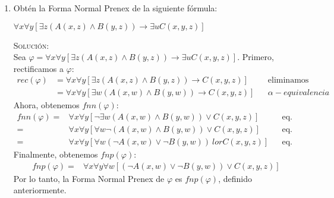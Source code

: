 \documentclass[letterpaper,11pt]{article}
\begin{document}
\begin{enumerate}
\begin{itemize}
        \end{itemize}
        \item Obtén la Forma Normal Prenex de la siguiente fórmula:
        \begin{center}
            $\forall x \forall y[\exists z (A(x,z) \land B(y,z)) 
            \rightarrow \exists u C(x,y,z)]$
        \end{center}
        \textsc{Solución:}\\
        Sea $\varphi = \forall x \forall y[\exists z (A(x,z) \land B(y,z)) 
        \rightarrow \exists u C(x,y,z)]$. Primero, rectificamos a $\varphi$:
        \begin{align*}
            rec(\varphi) 
            &= \forall x \forall y[\exists z (A(x,z) \land B(y,z)) \rightarrow 
            C(x,y,z)]
            && \text{eliminamos cuantificadores vacuos} \\
            &= \forall x \forall y[\exists w (A(x,w) \land B(y,w)) \rightarrow 
            C(x,y,z)]
            && \text{$\alpha - equivalencia$}
        \end{align*}
        Ahora, obtenemos $fnn(\varphi)$:
        \begin{align*}
            fnn(\varphi) 
            =& \forall x \forall y[\neg \exists w (A(x,w) \land B(y,w)) \lor
            C(x,y,z)]
            && \text{eq. lógica} \\
            =& \forall x \forall y[\forall w \neg (A(x,w) \land B(y,w)) \lor
            C(x,y,z)]
            && \text{eq. lógica} \\
            =& \forall x \forall y[\forall w (\neg A(x,w) \lor \neg B(y,w)) \
            lor C(x,y,z)]
            && \text{eq. lógica}
        \end{align*}
        Finalmente, obtenemos $fnp(\varphi)$:
        \begin{align*}
            fnp(\varphi) 
            =& \forall x \forall y \forall w [(\neg A(x,w) \lor \neg B(y,w)) 
            \lor C(x,y,z)] 
        \end{align*}
        Por lo tanto, la Forma Normal Prenex de $\varphi$ es $fnp(\varphi)$, 
        definido anteriormente.


\end{enumerate}
\end{document}

